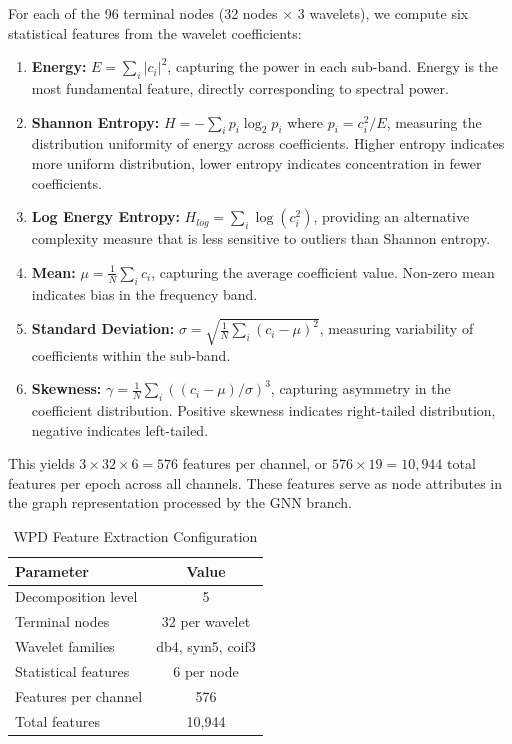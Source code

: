 \documentclass[blue,fullpaper]{ludusofficial}  %
\begin{document}
For each of the 96 terminal nodes (32 nodes $\times$ 3 wavelets), we compute six statistical features from the wavelet coefficients:

\begin{enumerate}
    \item \textbf{Energy:} $E = \sum_i |c_i|^2$, capturing the power in each sub-band. Energy is the most fundamental feature, directly corresponding to spectral power.

    \item \textbf{Shannon Entropy:} $H = -\sum_i p_i \log_2 p_i$ where $p_i = c_i^2 / E$, measuring the distribution uniformity of energy across coefficients. Higher entropy indicates more uniform distribution, lower entropy indicates concentration in fewer coefficients.

    \item \textbf{Log Energy Entropy:} $H_{log} = \sum_i \log(c_i^2)$, providing an alternative complexity measure that is less sensitive to outliers than Shannon entropy.

    \item \textbf{Mean:} $\mu = \frac{1}{N}\sum_i c_i$, capturing the average coefficient value. Non-zero mean indicates bias in the frequency band.

    \item \textbf{Standard Deviation:} $\sigma = \sqrt{\frac{1}{N}\sum_i (c_i - \mu)^2}$, measuring variability of coefficients within the sub-band.

    \item \textbf{Skewness:} $\gamma = \frac{1}{N}\sum_i ((c_i - \mu)/\sigma)^3$, capturing asymmetry in the coefficient distribution. Positive skewness indicates right-tailed distribution, negative indicates left-tailed.
\end{enumerate}

This yields $3 \times 32 \times 6 = 576$ features per channel, or $576 \times 19 = 10,944$ total features per epoch across all channels. These features serve as node attributes in the graph representation processed by the GNN branch.

\begin{table}[h!]
\centering
\caption{WPD Feature Extraction Configuration}
\label{tab:wpd}
\begin{tabular}{|l|c|}
\hline
\textbf{Parameter} & \textbf{Value} \\
\hline
Decomposition level & 5 \\
\hline
Terminal nodes & 32 per wavelet \\
\hline
Wavelet families & db4, sym5, coif3 \\
\hline
Statistical features & 6 per node \\
\hline
Features per channel & 576 \\
\hline
Total features & 10,944 \\
\hline
\end{tabular}
\end{table}
\end{document}
